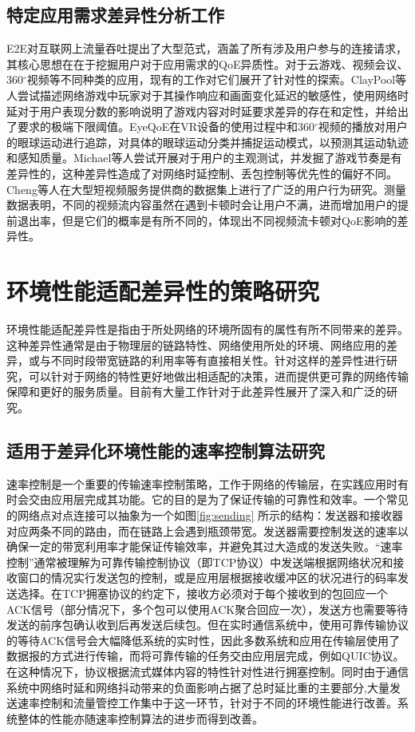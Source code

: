 \subsection{特定应用需求差异性分析工作}
E2E\cite{zhang2019e2e}对互联网上流量吞吐提出了大型范式，涵盖了所有涉及用户参与的连接请求，其核心思想在在于挖掘用户对于应用需求的QoE异质性。对于云游戏、视频会议、360$^{\circ}$视频等不同种类的应用，现有的工作对它们展开了针对性的探索。ClayPool等人尝试描述网络游戏中玩家对于其操作响应和画面变化延迟的敏感性\cite{claypool2006latency,claypool2010latency}，使用网络时延对于用户表现分数的影响说明了游戏内容对时延要求差异的存在和定性，并给出了要求的极端下限阈值。EyeQoE\cite{zhu2022eyeqoe}在VR设备的使用过程中和360$^{\circ}$视频的播放对用户的眼球运动进行追踪，对具体的眼球运动分类并捕捉运动模式，以预测其运动轨迹和感知质量。Michael等人尝试开展对于用户的主观测试\cite{jarschel2011evaluation}，并发掘了游戏节奏是有差异性的，这种差异性造成了对网络时延控制、丢包控制等优先性的偏好不同。Cheng等人在大型短视频服务提供商的数据集上进行了广泛的用户行为研究\cite{cheng2023rebuffering}。测量数据表明，不同的视频流内容虽然在遇到卡顿时会让用户不满，进而增加用户的提前退出率，但是它们的概率是有所不同的，体现出不同视频流卡顿对QoE影响的差异性。


\section{环境性能适配差异性的策略研究}
环境性能适配差异性是指由于所处网络的环境所固有的属性有所不同带来的差异。这种差异性通常是由于物理层的链路特性、网络使用所处的环境、网络应用的差异，或与不同时段带宽链路的利用率等有直接相关性。针对这样的差异性进行研究，可以针对于网络的特性更好地做出相适配的决策，进而提供更可靠的网络传输保障和更好的服务质量。目前有大量工作针对于此差异性展开了深入和广泛的研究。

\subsection{适用于差异化环境性能的速率控制算法研究}
速率控制是一个重要的传输速率控制策略，工作于网络的传输层，在实践应用时有时会交由应用层完成其功能。它的目的是为了保证传输的可靠性和效率。一个常见的网络点对点连接可以抽象为一个如图\ref{fig:sending} \cite{author2024performance}所示的结构：发送器和接收器对应两条不同的路由，而在链路上会遇到瓶颈带宽。发送器需要控制发送的速率以确保一定的带宽利用率才能保证传输效率，并避免其过大造成的发送失败。“速率控制”通常被理解为可靠传输控制协议（即TCP协议）中发送端根据网络状况和接收窗口的情况实行发送包的控制，或是应用层根据接收缓冲区的状况进行的码率发送选择。在TCP拥塞协议的约定下，接收方必须对于每个接收到的包回应一个ACK信号（部分情况下，多个包可以使用ACK聚合回应一次），发送方也需要等待发送的前序包确认收到后再发送后续包。但在实时通信系统中，使用可靠传输协议的等待ACK信号会大幅降低系统的实时性，因此多数系统和应用在传输层使用了数据报的方式进行传输，而将可靠传输的任务交由应用层完成，例如QUIC\cite{langley2017quic}协议。在这种情况下，协议根据流式媒体内容的特性针对性进行拥塞控制。同时由于通信系统中网络时延和网络抖动带来的负面影响占据了总时延比重的主要部分\cite{yuan2022understanding},大量发送速率控制和流量管控工作集中于这一环节，针对于不同的环境性能进行改善。系统整体的性能亦随速率控制算法的进步而得到改善。

